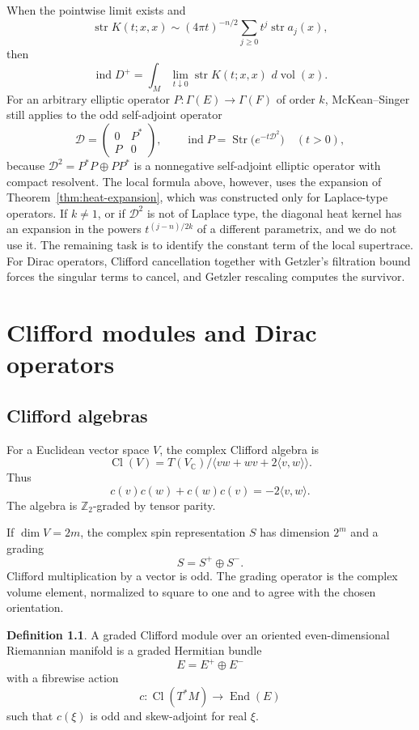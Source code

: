 \documentclass[11pt,oneside,reqno]{book}
\DeclareMathOperator{\Str}{Str}
\DeclareMathOperator{\ind}{ind}
\DeclareMathOperator{\Cl}{Cl}
\newcommand{\C}{\mathbb C}
\newcommand{\Z}{\mathbb Z}
\newcommand{\dd}{\,d}
\theoremstyle{plain}
\theoremstyle{definition}
\newtheorem{definition}[theorem]{Definition}
\theoremstyle{remark}
\begin{document}
When the pointwise limit exists and
\[
 \operatorname{str}K(t;x,x)
 \sim
 (4\pi t)^{-n/2}\sum_{j\geq0}t^j\operatorname{str}a_j(x),
\]
then
\[
 \ind D^+
 =
 \int_M
 \lim_{t\downarrow0}\operatorname{str}K(t;x,x)
 \,\dd\operatorname{vol}(x).
\]
For an arbitrary elliptic operator \(P:\Gamma(E)\to\Gamma(F)\) of order
\(k\), McKean--Singer still applies to the odd self-adjoint operator
\[
 \mathcal D=
 \begin{pmatrix}0&P^*\\P&0\end{pmatrix},
 \qquad
 \ind P=\Str\bigl(e^{-t\mathcal D^2}\bigr)\quad(t>0),
\]
because \(\mathcal D^2=P^*P\oplus PP^*\) is a nonnegative self-adjoint
elliptic operator with compact resolvent.  The local formula above,
however, uses the expansion of Theorem~\ref{thm:heat-expansion}, which was
constructed only for Laplace-type operators.  If \(k\ne1\), or if
\(\mathcal D^2\) is not of Laplace type, the diagonal heat kernel has an
expansion in the powers \(t^{(j-n)/2k}\) of a different parametrix, and
we do not use it.  The remaining task is to identify the constant term of the local
supertrace. For Dirac operators, Clifford cancellation together with
Getzler's filtration bound forces the singular terms to cancel, and
Getzler rescaling computes the survivor.


\chapter{Clifford modules and Dirac operators}

\section{Clifford algebras}

For a Euclidean vector space \(V\), the complex Clifford algebra is
\[
 \Cl(V)=T(V_\C)\big/
 \langle vw+wv+2\langle v,w\rangle\rangle.
\]
Thus
\[
 c(v)c(w)+c(w)c(v)=-2\langle v,w\rangle.
\]
The algebra is \(\Z_2\)-graded by tensor parity.

If \(\dim V=2m\), the complex spin representation \(S\) has dimension
\(2^m\) and a grading
\[
 S=S^+\oplus S^-.
\]
Clifford multiplication by a vector is odd. The grading operator is the
complex volume element, normalized to square to one and to agree with the
chosen orientation.

\begin{definition}
A graded Clifford module over an oriented even-dimensional Riemannian
manifold is a graded Hermitian bundle
\[
 E=E^+\oplus E^-
\]
with a fibrewise action
\[
 c:\Cl(T^*M)\longrightarrow\operatorname{End}(E)
\]
such that \(c(\xi)\) is odd and skew-adjoint for real \(\xi\).
\end{definition}
\end{document}
